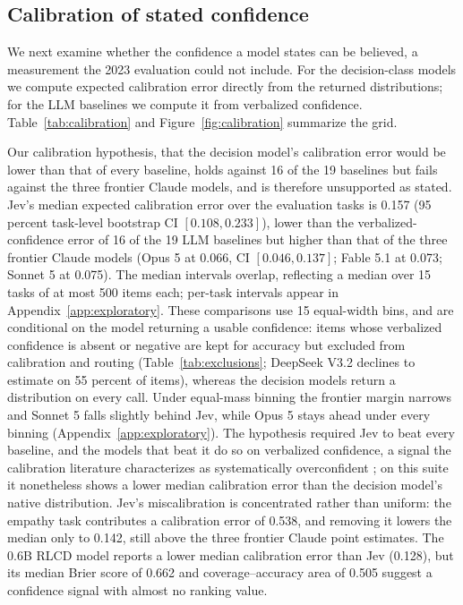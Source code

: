 \documentclass[11pt]{article}
\begin{document}
\subsection{Calibration of stated confidence}

We next examine whether the confidence a model states can be believed, a measurement the 2023 evaluation could not include. For the decision-class models we compute expected calibration error directly from the returned distributions; for the LLM baselines we compute it from verbalized confidence. Table~\ref{tab:calibration} and Figure~\ref{fig:calibration} summarize the grid.

Our calibration hypothesis, that the decision model's calibration error would be lower than that of every baseline, holds against 16 of the 19 baselines but fails against the three frontier Claude models, and is therefore unsupported as stated. Jev's median expected calibration error over the evaluation tasks is 0.157 (95 percent task-level bootstrap CI $[0.108, 0.233]$), lower than the verbalized-confidence error of 16 of the 19 LLM baselines but higher than that of the three frontier Claude models (Opus 5 at 0.066, CI $[0.046, 0.137]$; Fable 5.1 at 0.073; Sonnet 5 at 0.075). The median intervals overlap, reflecting a median over 15 tasks of at most 500 items each; per-task intervals appear in Appendix~\ref{app:exploratory}. These comparisons use 15 equal-width bins, and are conditional on the model returning a usable confidence: items whose verbalized confidence is absent or negative are kept for accuracy but excluded from calibration and routing (Table~\ref{tab:exclusions}; DeepSeek V3.2 declines to estimate on 55 percent of items), whereas the decision models return a distribution on every call. Under equal-mass binning the frontier margin narrows and Sonnet 5 falls slightly behind Jev, while Opus 5 stays ahead under every binning (Appendix~\ref{app:exploratory}). The hypothesis required Jev to beat every baseline, and the models that beat it do so on verbalized confidence, a signal the calibration literature characterizes as systematically overconfident \citep{xiong2023can, tian2023just}; on this suite it nonetheless shows a lower median calibration error than the decision model's native distribution. Jev's miscalibration is concentrated rather than uniform: the empathy task contributes a calibration error of 0.538, and removing it lowers the median only to 0.142, still above the three frontier Claude point estimates. The 0.6B RLCD model reports a lower median calibration error than Jev (0.128), but its median Brier score of 0.662 and coverage--accuracy area of 0.505 suggest a confidence signal with almost no ranking value.
\end{document}
